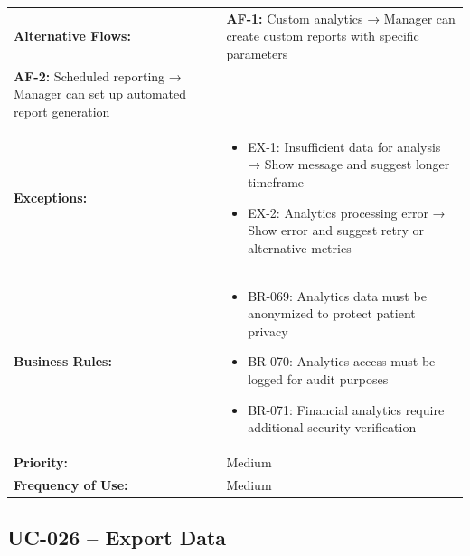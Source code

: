 \documentclass[12pt,a4paper]{article}
\begin{document}
\begin{longtable}{|p{4.5cm}|p{10.5cm}|}
\hline
\textbf{Alternative Flows:} &
\textbf{AF-1:} Custom analytics → Manager can create custom reports with specific parameters \\
\textbf{AF-2:} Scheduled reporting → Manager can set up automated report generation \\
\hline
\textbf{Exceptions:} &
\begin{itemize}
  \item EX-1: Insufficient data for analysis → Show message and suggest longer timeframe
  \item EX-2: Analytics processing error → Show error and suggest retry or alternative metrics
\end{itemize} \\
\hline
\textbf{Business Rules:} &
\begin{itemize}
  \item BR-069: Analytics data must be anonymized to protect patient privacy
  \item BR-070: Analytics access must be logged for audit purposes
  \item BR-071: Financial analytics require additional security verification
\end{itemize} \\
\hline
\textbf{Priority:} & Medium \\
\hline
\textbf{Frequency of Use:} & Medium \\
\hline
\end{longtable}

\subsection{UC-026 – Export Data}
\end{document}
